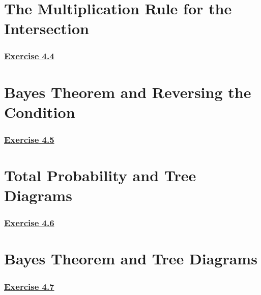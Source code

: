 \documentclass[
  11pt,
]{book}
\begin{document}
\section{The Multiplication Rule for the Intersection}\label{the-multiplication-rule-for-the-intersection}

\subsubsection*{\texorpdfstring{\hyperref[ex44a]{Exercise 4.4}}{Exercise 4.4}}\label{exercise-4.4}

\section{Bayes Theorem and Reversing the Condition}\label{bayes-theorem-and-reversing-the-condition}

\subsubsection*{\texorpdfstring{\hyperref[ex45a]{Exercise 4.5}}{Exercise 4.5}}\label{exercise-4.5}

\section{Total Probability and Tree Diagrams}\label{total-probability-and-tree-diagrams}

\subsubsection*{\texorpdfstring{\hyperref[ex46a]{Exercise 4.6}}{Exercise 4.6}}\label{exercise-4.6}

\section{Bayes Theorem and Tree Diagrams}\label{bayes-theorem-and-tree-diagrams}

\subsubsection*{\texorpdfstring{\hyperref[ex47a]{Exercise 4.7}}{Exercise 4.7}}\label{exercise-4.7}
\end{document}
